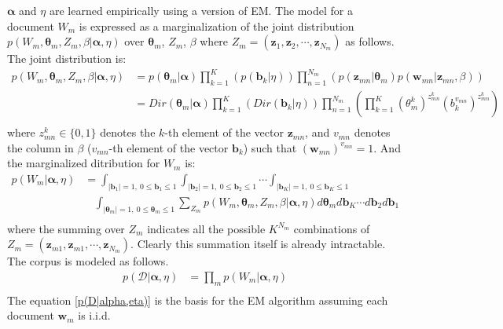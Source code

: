 \documentclass[a4]{article}
\begin{document}
$\bm{\alpha}$ and $\eta$ are learned empirically using a version of EM.
The model for a document $W_m$ is expressed as a marginalization of the joint
distribution
$p(W_m, \bm{\theta}_m, Z_m, \beta | \bm{\alpha}, \eta )$
over $\bm{\theta}_m$, $Z_m$, $\beta$ where
$Z_m = (\mathbf{z}_1, \mathbf{z}_2, \cdots, \mathbf{z}_{N_m})$ as follows.
The joint distribution is:
\begin{equation}
\begin{aligned}
p( W_m, \bm{\theta}_m, Z_m, \beta | \bm{\alpha}, \eta ) 
    &= p( \bm{\theta}_m | \bm{\alpha} )
       \prod_{k=1}^{K} \left( p( \mathbf{b}_k | \eta ) \right )
       \prod_{n=1}^{N_m} \left( 
           p( \mathbf{z}_{mn} | \bm{\theta}_m          )
           p( \mathbf{w}_{mn} | \mathbf{z}_{mn}, \beta )
       \right)\\
    &= Dir( \bm{\theta}_m | \bm{\alpha} )
       \prod_{k=1}^{K} \left( Dir( \mathbf{b}_k | \eta ) \right)
       \prod_{n=1}^{N_m} \left(
           \prod_{k=1}^{K}
               (\theta_m^k)^{z_{mn}^k} 
               (b_k^{v_{mn}})^{z_{mn}^k} 
       \right) \label{p(W_m,theta_m,Z_m,beta|alpha,eta)}\\
\end{aligned}
\end{equation}
where ${z_{mn}^k} \in \{0,1\}$ denotes the $k$-th element of 
the vector $\mathbf{z}_{mn}$, and $v_{mn}$ denotes the 
column in $\beta$ ($v_{mn}$-th element of the vector $\mathbf{b}_k$)
 such that $(\mathbf{w}_{mn})^{v_{mn}} = 1$.
And the marginalized ditribution for $W_m$ is:
\begin{equation}
\begin{aligned}
p(W_m | \bm{\alpha}, \eta)
   &= \int_{|\mathbf{b}_1| = 1,\: 0 \le \mathbf{b}_1 \le 1}
      \int_{|\mathbf{b}_2| = 1,\: 0 \le \mathbf{b}_2 \le 1}
      \cdots
      \int_{|\mathbf{b}_K| = 1,\: 0 \le \mathbf{b}_K \le 1}\\
   &\:\:\:\:\int_{|\bm{\theta}_m|=1,\: 0 \le \bm{\theta}_m \le 1} 
      \sum_{Z_{m}} p( W_m, \bm{\theta}_m, Z_m, \beta | 
      \bm{\alpha}, \eta ) d\bm{\theta}_m
      d\mathbf{b}_K \cdots d\mathbf{b}_2 d\mathbf{b}_1\label{p(W_m|alpha,eta)}\\
\end{aligned}
\end{equation}
where the summing over $Z_{m}$ indicates all the possible $K^{N_m}$ 
combinations of
$Z_{m} = (\mathbf{z}_{m1}, \mathbf{z}_{m1}, \cdots, \mathbf{z}_{N_m} )$.
Clearly this summation itself is already intractable.
The corpus is modeled as follows.
\begin{equation}
\begin{aligned}
p( \mathcal{D} | \bm{\alpha}, \eta ) 
    &= \prod_{m} p( W_m | \bm{\alpha}, \eta )\label{p(D|alpha,eta)}\\
\end{aligned}
\end{equation}
The equation \ref{p(D|alpha,eta)} is the basis for the EM algorithm assuming
each document $\mathbf{w}_m$ is i.i.d.
\end{document}

